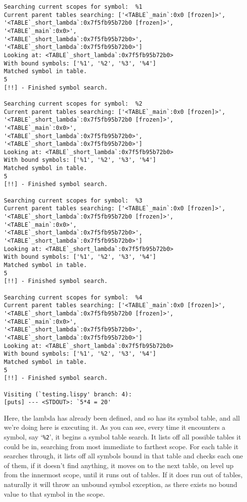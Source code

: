\documentclass{article}
\newcommand{\code}[1]{\texttt{#1}}
\begin{document}
    \begin{verbatim}
Searching current scopes for symbol:  %1
Current parent tables searching: ['<TABLE`_main`:0x0 [frozen]>',
'<TABLE`_short_lambda`:0x7f5fb95b72b0 [frozen]>', '<TABLE`_main`:0x0>',
'<TABLE`_short_lambda`:0x7f5fb95b72b0>', '<TABLE`_short_lambda`:0x7f5fb95b72b0>']
Looking at: <TABLE`_short_lambda`:0x7f5fb95b72b0>
With bound symbols: ['%1', '%2', '%3', '%4']
Matched symbol in table.
5
[!!] - Finished symbol search.

Searching current scopes for symbol:  %2
Current parent tables searching: ['<TABLE`_main`:0x0 [frozen]>',
'<TABLE`_short_lambda`:0x7f5fb95b72b0 [frozen]>', '<TABLE`_main`:0x0>',
'<TABLE`_short_lambda`:0x7f5fb95b72b0>', '<TABLE`_short_lambda`:0x7f5fb95b72b0>']
Looking at: <TABLE`_short_lambda`:0x7f5fb95b72b0>
With bound symbols: ['%1', '%2', '%3', '%4']
Matched symbol in table.
5
[!!] - Finished symbol search.

Searching current scopes for symbol:  %3
Current parent tables searching: ['<TABLE`_main`:0x0 [frozen]>',
'<TABLE`_short_lambda`:0x7f5fb95b72b0 [frozen]>', '<TABLE`_main`:0x0>',
'<TABLE`_short_lambda`:0x7f5fb95b72b0>', '<TABLE`_short_lambda`:0x7f5fb95b72b0>']
Looking at: <TABLE`_short_lambda`:0x7f5fb95b72b0>
With bound symbols: ['%1', '%2', '%3', '%4']
Matched symbol in table.
5
[!!] - Finished symbol search.

Searching current scopes for symbol:  %4
Current parent tables searching: ['<TABLE`_main`:0x0 [frozen]>',
'<TABLE`_short_lambda`:0x7f5fb95b72b0 [frozen]>', '<TABLE`_main`:0x0>',
'<TABLE`_short_lambda`:0x7f5fb95b72b0>', '<TABLE`_short_lambda`:0x7f5fb95b72b0>']
Looking at: <TABLE`_short_lambda`:0x7f5fb95b72b0>
With bound symbols: ['%1', '%2', '%3', '%4']
Matched symbol in table.
5
[!!] - Finished symbol search.

Visiting (`testing.lispy' branch: 4):
[puts] --- <STDOUT>: `5*4 = 20'
\end{verbatim}
\clearpage
    Here, the lambda has already been defined, and so has its symbol table,
    and all we're doing here is executing it. As you can see, every time
    it encounters a symbol, say `\code{\%2}', it begins a symbol table search.
    It lists off all possible tables it could be in, searching from most immediate
    to farthest scope. For each table it searches through, it lists off all
    symbols bound in that table and checks each one of them, if it doesn't
    find anything, it moves on to the next table, on level up from the innermost
    scope, until it runs out of tables. If it does run out of tables, naturally
    it will throw an unbound symbol exception, as there exists no bound value
    to that symbol in the scope.
\end{document}
